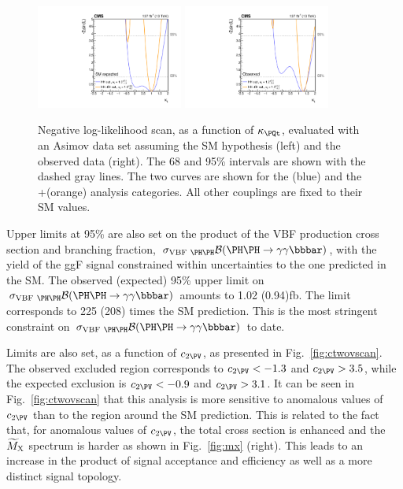 \documentclass[11pt,twoside,a4paper,cmspaper,final,collab]{cms-tdr}
\begin{document}
\begin{figure}[!htb]
  \centering
\includegraphics[width=0.43\textwidth]{Figure_013-a.pdf}
\includegraphics[width=0.43\textwidth]{Figure_013-b.pdf}
  \caption{Negative log-likelihood scan, as a function of $\kapt$, evaluated with an Asimov data set assuming the SM hypothesis (left) and the observed data (right).
 The 68 and 95\% \CL intervals are shown with the dashed gray lines.
 The two curves are shown for the \HH (blue) and the \HH+\ttH (orange) analysis categories. All other couplings are fixed to their SM values.
}
\label{fig:kaptlikelihood}
\end{figure}

Upper limits at 95\% \CL are also set on the product of the \HH VBF production cross section and branching fraction, $\sigmaVBF \BR$, with the yield of the ggF \HH signal constrained within uncertainties to the one predicted in the SM.
 The observed (expected) 95\% \CL upper limit on 
 $\sigmaVBF \BR$ 
amounts to 1.02 (0.94)\unit{fb}. The limit corresponds to 225 (208) times the SM prediction. This is the most stringent constraint on
 $\sigmaVBF \BR$ 
to date. 

Limits are also set, as a function of $\ctwov$, as presented in Fig.~\ref{fig:ctwovscan}. The observed excluded region
corresponds to $\ctwov < -1.3$ and $\ctwov > 3.5$, while the expected exclusion is $\ctwov < -0.9$ and $\ctwov > 3.1$. It can be seen in Fig.~\ref{fig:ctwovscan} that this analysis is more sensitive to anomalous values of $\ctwov$ than to the region around the SM prediction. This is related to the fact that, for anomalous values of $\ctwov$, the total cross section is enhanced and the $\widetilde{M}_{\mathrm{X}}$ spectrum is harder as shown in Fig.~\ref{fig:mx} (right). This leads to an
increase in the product of signal acceptance and efficiency as well as a more distinct signal topology.
\end{document}
